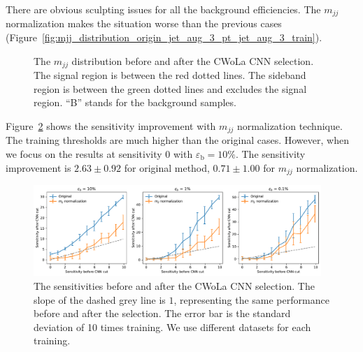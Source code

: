 \documentclass[12pt]{article}
\begin{document}
			There are obvious sculpting issues for all the background efficiencies. The $m_{jj}$ normalization makes the situation worse than the previous cases (Figure~\ref{fig:mjj_distribution_origin_jet_aug_3_pt_jet_aug_3_train}).
			\begin{figure}[htpb]
				\centering
				\caption{The $m_{jj}$ distribution before and after the CWoLa CNN selection. The signal region is between the red dotted lines. The sideband region is between the green dotted lines and excludes the signal region. ``B'' stands for the background samples.}
				\label{fig:mjj_distribution_mjj_normalized_origin_train}
			\end{figure}

			 Figure~\ref{fig:sensitivity_improvement_background_subtraction_origin_mjj_normalized} shows the sensitivity improvement with $m_{jj}$ normalization technique. The training thresholds are much higher than the original cases. However, when we focus on the results at sensitivity 0 with $\varepsilon_{\text{b}} = 10\%$. The sensitivity improvement is $2.63 \pm 0.92$ for original method, $0.71 \pm 1.00$ for $m_{jj}$ normalization. 
			\begin{figure}[htpb]
				\centering
				\includegraphics[width=0.97\textwidth]{HVmodel_sensitivity_improvement_origin_mjj_normalied.pdf}
				\caption{The sensitivities before and after the CWoLa CNN selection. The slope of the dashed grey line is $1$, representing the same performance before and after the selection. The error bar is the standard deviation of 10 times training. We use different datasets for each training.}
				\label{fig:sensitivity_improvement_background_subtraction_origin_mjj_normalized}
			\end{figure}
\end{document}
